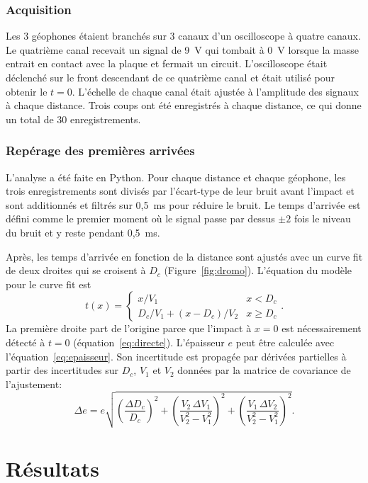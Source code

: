 \documentclass[11pt,letterpaper]{article}
\newcommand{\beq}[1]{\begin{equation} \label{#1}}
\def\enq{\end{equation}}
\begin{document}
\subsubsection*{Acquisition}
Les 3 géophones étaient branchés sur 3 canaux d'un oscilloscope à quatre canaux. Le quatrième canal recevait un signal de 9~V qui tombait à 0~V lorsque la masse entrait en contact avec la plaque et fermait un circuit. L'oscilloscope était déclenché sur le front descendant de ce quatrième canal et était utilisé pour obtenir le $t = 0$. L'échelle de chaque canal était ajustée à l'amplitude des signaux à chaque distance. Trois coups ont été enregistrés à chaque distance, ce qui donne un total de 30 enregistrements.

\subsubsection*{Repérage des premières arrivées}
L'analyse a été faite en Python. Pour chaque distance et chaque géophone, les trois enregistrements sont divisés par l'écart-type de leur bruit avant l'impact et sont additionnés et filtrés sur 0,5~ms pour réduire le bruit. Le temps d'arrivée est défini comme le premier moment où le signal passe par dessus $\pm 2$ fois le niveau du bruit et y reste pendant 0,5~ms.

Après, les temps d'arrivée en fonction de la distance sont ajustés avec un curve fit de deux droites qui se croisent à $D_c$ (Figure~\ref{fig:dromo}). L'équation du modèle pour le curve fit est
\beq{eq:modele}
    t(x) =
    \begin{cases}
        x/V_1 & x < D_c \\
        D_c/V_1 + (x - D_c)/V_2 & x \geq D_c
    \end{cases} .
\enq
La première droite part de l'origine parce que l'impact à $x = 0$ est nécessairement détecté à $t = 0$ (équation~\ref{eq:directe}). L'épaisseur $e$ peut être calculée avec l'équation~\ref{eq:epaisseur}. Son incertitude est propagée par dérivées partielles à partir des incertitudes sur $D_c$, $V_1$ et $V_2$ données par la matrice de covariance de l'ajustement:
\beq{eq:incertitude}
    \Delta e = e\sqrt{\left(\frac{\Delta D_c}{D_c}\right)^2 + \left(\frac{V_2\,\Delta V_1}{V_2^2 - V_1^2}\right)^2 + \left(\frac{V_1\,\Delta V_2}{V_2^2 - V_1^2}\right)^2} .
\enq

\section{Résultats}
\label{sec:resultats}
\end{document}
